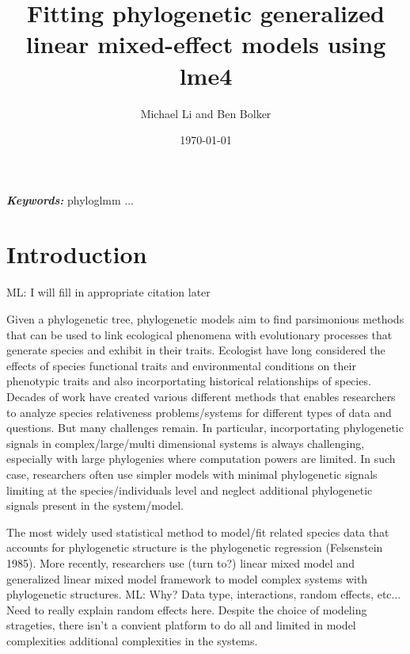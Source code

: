\documentclass[12pt]{article}
\title{Fitting phylogenetic generalized linear mixed-effect models using lme4 }
\author{Michael Li and Ben Bolker}
\date{\today}
\providecommand{\keywords}[1]{\textbf{\textit{Keywords:}} #1}
\begin{document}
\newcommand{\dbic}{\ensuremath \Delta \textrm{BIC}}

\newcommand{\bmbhide}[1]{}
\newcommand{\bmb}[1]{{\color{blue} BB: #1}}

\newcommand{\fref}[1]{Figure~\ref{fig:#1}}

\newcommand{\ml}[1]{{\color{red} ML: #1}}

\newcommand{\add}[1]{{\color{blue} ADD: #1}}

\maketitle

\doublespacing

\keywords{phyloglmm ... }

\section{Introduction}
\ml{I will fill in appropriate citation later}


Given a phylogenetic tree, phylogenetic models aim to find parsimonious methods that can be used to link ecological phenomena with evolutionary processes that generate species and exhibit in their traits.
Ecologist have long considered the effects of species functional traits and environmental conditions on their phenotypic traits and also incorportating historical relationships of species.
Decades of work have created various different methods that enables researchers to analyze species relativeness problems/systems for different types of data and questions.
But many challenges remain.
In particular, incorportating phylogenetic signals in complex/large/multi dimensional systems is always challenging, especially with large phylogenies where computation powers are limited.
In such case, researchers often use simpler models with minimal phylogenetic signals limiting at the species/individuals level and neglect additional phylogenetic signals present in the system/model.

The most widely used statistical method to model/fit related species data that accounts for phylogenetic structure is the phylogenetic regression (Felsenstein 1985). 
More recently, researchers use (turn to?) linear mixed model and generalized linear mixed model framework to model complex systems with phylogenetic structures. 
\ml{Why? Data type, interactions, random effects, etc... Need to really explain random effects here.}
Despite the choice of modeling strageties, there isn't a convient platform to do all and limited in model complexities additional complexities in the systems. 
\end{document}
